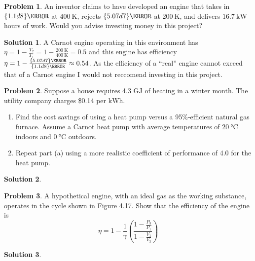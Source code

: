 \documentclass[10pt]{article}
\theoremstyle{definition}
\newtheorem{problem}{Problem}
\newtheorem{soln}{Solution}
\begin{document}
\begin{problem}
An inventor claims to have developed an engine that takes in $\qty{1.1d8}{\joule}$ at $\qty{400}{\kelvin}$,
rejects $\qty{5.07d7}{\joule}$ at $\qty{200}{\kelvin}$, and delivers $\qty{16.7}{\kilo\watt}$ hours of work.
Would you advise investing money in this project?
\end{problem}
\begin{soln}
  A Carnot engine operating in this environment has $\eta=1-\frac{T_2}{T_1}=1-\frac{\qty{200}{\kelvin}}{\qty{400}{\kelvin}}=0.5$ and this engine has efficiency
  $\eta=1-\frac{\qty{5.07d7}{\joule}}{\qty{1.1d8}{\joule}}\approx0.54$. As the efficiency of a ``real'' engine cannot exceed that of a Carnot engine I would not
  reccomend investing in this project.
\end{soln}

\begin{problem}
Suppose a house requires 4.3 GJ of heating in a winter month. The
utility company charges \$0.14 per $\unit{\kilo\watt\hour}$.
\begin{enumerate}[label=(\alph*)]
  \item Find the cost savings of using a heat pump versus a 95\%-efficient natural gas furnace. Assume
        a Carnot heat pump with average temperatures of $\qty{20}{\degreeCelsius}$ indoors and $\qty{0}{\degreeCelsius}$ outdoors.
  \item Repeat part (a) using a more realistic coefficient of performance of 4.0 for the heat pump.
\end{enumerate}
\end{problem}
\begin{soln}
\end{soln}

\begin{problem}
A hypothetical engine, with an ideal gas as the working substance,
operates in the cycle shown in Figure 4.17. Show that the efficiency of
the engine is
$$\eta=1-\frac{1}{\gamma}\left(\frac{1-\frac{P_3}{P_1}}{1-\frac{V_1}{V_3}}\right)$$
\end{problem}
\begin{soln}
\end{soln}
\end{document}
